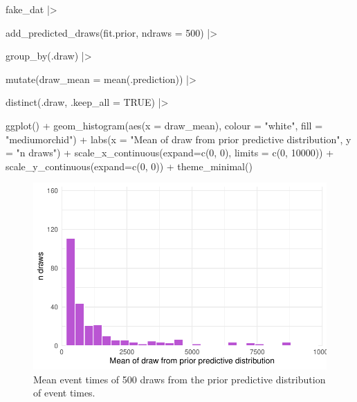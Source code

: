 \documentclass[
  letterpaper,
  DIV=11,
  numbers=noendperiod]{scrreprt}
\newenvironment{Shaded}{\begin{snugshade}}{\end{snugshade}}
\newcommand{\AttributeTok}[1]{\textcolor[rgb]{0.40,0.45,0.13}{#1}}
\newcommand{\ConstantTok}[1]{\textcolor[rgb]{0.56,0.35,0.01}{#1}}
\newcommand{\DecValTok}[1]{\textcolor[rgb]{0.68,0.00,0.00}{#1}}
\newcommand{\FunctionTok}[1]{\textcolor[rgb]{0.28,0.35,0.67}{#1}}
\newcommand{\NormalTok}[1]{\textcolor[rgb]{0.00,0.23,0.31}{#1}}
\newcommand{\SpecialCharTok}[1]{\textcolor[rgb]{0.37,0.37,0.37}{#1}}
\newcommand{\StringTok}[1]{\textcolor[rgb]{0.13,0.47,0.30}{#1}}
\begin{document}
\begin{Shaded}
\begin{Highlighting}[]
\NormalTok{fake\_dat }\SpecialCharTok{|\textgreater{}}
 
  \FunctionTok{add\_predicted\_draws}\NormalTok{(fit.prior, }\AttributeTok{ndraws =} \DecValTok{500}\NormalTok{) }\SpecialCharTok{|\textgreater{}}

  \FunctionTok{group\_by}\NormalTok{(.draw) }\SpecialCharTok{|\textgreater{}}

  \FunctionTok{mutate}\NormalTok{(}\AttributeTok{draw\_mean =} \FunctionTok{mean}\NormalTok{(.prediction)) }\SpecialCharTok{|\textgreater{}}

  \FunctionTok{distinct}\NormalTok{(.draw, }\AttributeTok{.keep\_all =} \ConstantTok{TRUE}\NormalTok{) }\SpecialCharTok{|\textgreater{}}

  \FunctionTok{ggplot}\NormalTok{() }\SpecialCharTok{+} 
  \FunctionTok{geom\_histogram}\NormalTok{(}\FunctionTok{aes}\NormalTok{(}\AttributeTok{x =}\NormalTok{ draw\_mean), }\AttributeTok{colour =} \StringTok{"white"}\NormalTok{, }\AttributeTok{fill =} \StringTok{"mediumorchid"}\NormalTok{) }\SpecialCharTok{+}
  \FunctionTok{labs}\NormalTok{(}\AttributeTok{x =} \StringTok{"Mean of draw from prior predictive distribution"}\NormalTok{, }\AttributeTok{y =} \StringTok{"n draws"}\NormalTok{) }\SpecialCharTok{+}
  \FunctionTok{scale\_x\_continuous}\NormalTok{(}\AttributeTok{expand=}\FunctionTok{c}\NormalTok{(}\DecValTok{0}\NormalTok{, }\DecValTok{0}\NormalTok{), }\AttributeTok{limits =} \FunctionTok{c}\NormalTok{(}\DecValTok{0}\NormalTok{, }\DecValTok{10000}\NormalTok{)) }\SpecialCharTok{+}
  \FunctionTok{scale\_y\_continuous}\NormalTok{(}\AttributeTok{expand=}\FunctionTok{c}\NormalTok{(}\DecValTok{0}\NormalTok{, }\DecValTok{0}\NormalTok{)) }\SpecialCharTok{+}
  \FunctionTok{theme\_minimal}\NormalTok{()}
\end{Highlighting}
\end{Shaded}

\begin{figure}[H]

{\centering \includegraphics{./bayesian-cfa_files/figure-pdf/prior-pred-1-means-1.pdf}

}

\caption{Mean event times of 500 draws from the prior predictive
distribution of event times.}

\end{figure}
\end{document}
